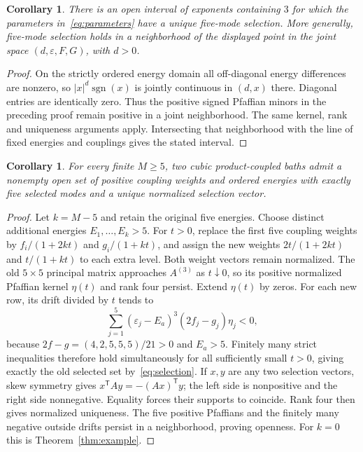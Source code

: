 \documentclass[11pt]{article}
\newtheorem{corollary}[theorem]{Corollary}
\newcommand{\sgn}{\operatorname{sgn}}
\begin{document}
\begin{corollary}\label{cor:exponents}
There is an open interval of exponents containing $3$ for
which the parameters in~\eqref{eq:parameters} have a unique
five-mode selection. More generally, five-mode selection
holds in a neighborhood of the displayed point in the joint
space $(d,\varepsilon,F,G)$, with $d>0$.
\end{corollary}
\begin{proof}
On the strictly ordered energy domain all off-diagonal energy
differences are nonzero, so $|x|^d\sgn(x)$ is jointly continuous
in $(d,x)$ there. Diagonal entries are identically zero.
Thus the positive signed Pfaffian minors in the preceding
proof remain positive in a joint neighborhood. The same
kernel, rank and uniqueness arguments apply. Intersecting
that neighborhood with the line of fixed energies and
couplings gives the stated interval.
\end{proof}

\begin{corollary}\label{cor:extra}
For every finite $M\geq5$, two cubic product-coupled baths
admit a nonempty open set of positive coupling weights and
ordered energies with exactly five selected modes and a unique
normalized selection vector.
\end{corollary}
\begin{proof}
Let $k=M-5$ and retain the original five energies. Choose distinct
additional energies $E_1,\ldots,E_k>5$. For $t>0$, replace the
first five coupling weights by $f_i/(1+2kt)$ and $g_i/(1+kt)$,
and assign the new weights $2t/(1+2kt)$ and $t/(1+kt)$ to
each extra level. Both weight vectors remain normalized.
The old $5\times5$ principal matrix approaches $A^{(3)}$ as
$t\downarrow0$, so its positive normalized Pfaffian kernel
$\eta(t)$ and rank four persist. Extend $\eta(t)$ by zeros.
For each new row, its drift divided by $t$ tends to
\[
 \sum_{j=1}^5(\varepsilon_j-E_a)^3(2f_j-g_j)\eta_j<0,
\]
because $2f-g=(4,2,5,5,5)/21>0$ and $E_a>5$.
Finitely many strict inequalities therefore hold simultaneously
for all sufficiently small $t>0$, giving exactly the old selected
set by~\eqref{eq:selection}.
If $x,y$ are any two selection vectors, skew symmetry gives
$x^{\mathsf T}Ay=-(Ax)^{\mathsf T}y$; the left side is
nonpositive and the right side nonnegative. Equality forces
their supports to coincide. Rank four then gives normalized
uniqueness. The five positive Pfaffians and the finitely many
negative outside drifts persist in a neighborhood, proving openness.
For $k=0$ this is Theorem~\ref{thm:example}.
\end{proof}
\end{document}
